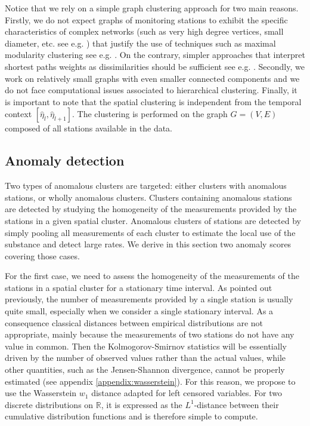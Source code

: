 Notice that we rely on a simple graph clustering approach for two main reasons. Firstly, we do not expect graphs of monitoring stations to exhibit the specific characteristics of complex networks (such as very high degree vertices, small diameter, etc. see e.g. \cite{Newman2003GraphSurveySIAM}) that justify the use of techniques such as maximal modularity clustering see e.g. \cite{FortunatoSurveyGraphs2010}. On the contrary, simpler approaches that interpret shortest paths weights as dissimilarities should be sufficient see e.g. \cite{Schaeffer:COSREV2007}. Secondly, we work on relatively small graphs with even smaller connected components and we do not face computational issues associated to hierarchical clustering. 
Finally, it is important to note that the spatial clustering is independent from the temporal context $[\widehat{\eta}_l,\widehat{\eta}_{l+1}]$. The clustering is performed on the graph $G=(V,E)$ composed of all stations available in the data. 

\subsection{Anomaly detection}\label{section:anomaly}

Two types of anomalous clusters are targeted: either clusters with anomalous stations, or wholly anomalous clusters. Clusters containing anomalous stations are detected by studying the homogeneity of the measurements provided by the stations in a given spatial cluster. Anomalous clusters of stations are detected by simply pooling all measurements of each cluster to estimate the local use of the substance and detect large rates. We derive in this section two anomaly scores covering those cases.

For the first case, we need to assess the homogeneity of the measurements of the stations in a spatial cluster for a stationary time interval. As pointed out previously, the number of measurements provided by a single station is usually quite small, especially when we consider a single stationary interval. As a consequence classical distances between empirical distributions are not appropriate, mainly because the measurements of two stations do not have any value in common. Then the Kolmogorov-Smirnov statistics will be essentially driven by the number of observed values rather than the actual values, while other quantities, such as the Jensen-Shannon divergence, cannot be properly estimated (see appendix \ref{appendix:wasserstein}). For this reason, we propose to use the Wasserstein $w_1$ distance \cite{villani2009optimal} adapted for left censored variables. For two discrete distributions on $\mathbb{R}$, it is expressed as the $L^1$-distance between their cumulative distribution functions and is therefore simple to compute. 


